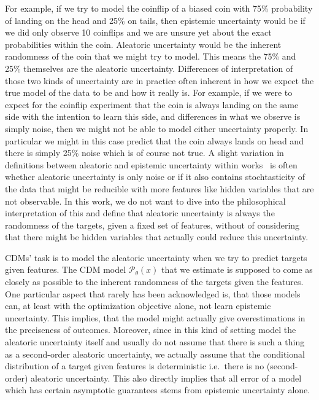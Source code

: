 For example, if we try to model the coinflip of a biased coin with 75\% probability of landing on the head and 25\% on tails, then epistemic uncertainty would be if we did only observe 10 coinflips and we are unsure yet about the exact probabilities within the coin. Aleatoric uncertainty would be the inherent randomness of the coin that we might try to model. This means the 75\% and 25\% themselves are the aleatoric uncertainty.
Differences of interpretation of those two kinds of uncertainty are in practice often inherent in how we expect the true model of the data to be and how it really is. For example, if we were to expect for the coinflip experiment that the coin is always landing on the same side with the intention to learn this side, and differences in what we observe is simply noise, then we might not be able to model either uncertainty properly. In particular we might in this case predict that the coin always lands on head and there is simply 25\% noise which is of course not true.
A slight variation in definitions between aleatoric and epistemic uncertainty within works~\cite{hullermeier_aleatoric_2021} is often whether aleatoric uncertainty is only noise or if it also contains stochtasticity of the data that might be reducible with more features like hidden variables that are not observable. In this work, we do not want to dive into the philosophical interpretation of this and define that aleatoric uncertainty is always the randomness of the targets, given a fixed set of features, without of considering that there might be hidden variables that actually could reduce this uncertainty.

CDMs' task is to model the aleatoric uncertainty when we try to predict targets given features. The CDM model $\mathscr{P}_\theta(x)$ that we estimate is supposed to come as closely as possible to the inherent randomness of the targets given the features. One particular aspect that rarely has been acknowledged is, that those models can, at least with the optimization objective alone, not learn epistemic uncertainty. This implies, that the model might actually give overestimations in the preciseness of outcomes. Moreover, since in this kind of setting model the aleatoric uncertainty itself and usually do not assume that there is such a thing as a second-order aleatoric uncertainty, we actually assume that the conditional distribution of a target given features is deterministic i.e.\ there is no (second-order) aleatoric uncertainty. This also directly implies that all error of a model which has certain asymptotic guarantees stems from epistemic uncertainty alone.

